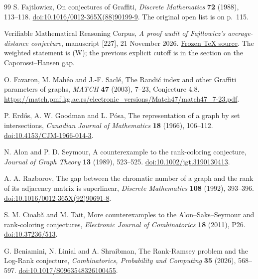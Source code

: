 \documentclass[11pt,a4paper]{article}
\theoremstyle{definition}
\theoremstyle{remark}
\numberwithin{equation}{section}
\begin{document}
\begin{thebibliography}{99}
S. Fajtlowicz, On conjectures of Graffiti,
\emph{Discrete Mathematics} \textbf{72} (1988), 113--118.
\href{https://doi.org/10.1016/0012-365X(88)90199-9}{doi:10.1016/0012-365X(88)90199-9}.
The original open list is on p.~115.

Verifiable Mathematical Reasoning Corpus,
\emph{A proof audit of Fajtlowicz's average-distance conjecture},
manuscript [227], 21 November 2026.
\href{https://github.com/QEEDDD/Verifiable-Mathematical-Reasoning-Corpus/blob/52c1e4ae1f82bd3fdc8b809b9a94e2e4c6ef4cb3/\%5B227\%5D\%20Fajtlowicz_Proof_Audit.tex}{Frozen TeX source}.
The weighted statement is (W); the previous explicit cutoff is in
the section on the Caporossi--Hansen gap.

O. Favaron, M. Mah\'eo and J.-F. Sacl\'e,
The Randi\'c index and other Graffiti parameters of graphs,
\emph{MATCH} \textbf{47} (2003), 7--23, Conjecture 4.8.
\url{https://match.pmf.kg.ac.rs/electronic_versions/Match47/match47_7-23.pdf}.

P. Erd\H{o}s, A. W. Goodman and L. P\'osa,
The representation of a graph by set intersections,
\emph{Canadian Journal of Mathematics} \textbf{18} (1966), 106--112.
\href{https://doi.org/10.4153/CJM-1966-014-3}{doi:10.4153/CJM-1966-014-3}.

N. Alon and P. D. Seymour,
A counterexample to the rank-coloring conjecture,
\emph{Journal of Graph Theory} \textbf{13} (1989), 523--525.
\href{https://doi.org/10.1002/jgt.3190130413}{doi:10.1002/jgt.3190130413}.

A. A. Razborov,
The gap between the chromatic number of a graph and the rank of its
adjacency matrix is superlinear,
\emph{Discrete Mathematics} \textbf{108} (1992), 393--396.
\href{https://doi.org/10.1016/0012-365X(92)90691-8}{doi:10.1016/0012-365X(92)90691-8}.

S. M. Cioab\u{a} and M. Tait,
More counterexamples to the Alon--Saks--Seymour and rank-coloring conjectures,
\emph{Electronic Journal of Combinatorics} \textbf{18} (2011), P26.
\href{https://doi.org/10.37236/513}{doi:10.37236/513}.

G. Beniamini, N. Linial and A. Shraibman,
The Rank-Ramsey problem and the Log-Rank conjecture,
\emph{Combinatorics, Probability and Computing} \textbf{35} (2026), 568--597.
\href{https://doi.org/10.1017/S0963548326100455}{doi:10.1017/S0963548326100455}.


\end{thebibliography}
\end{document}
